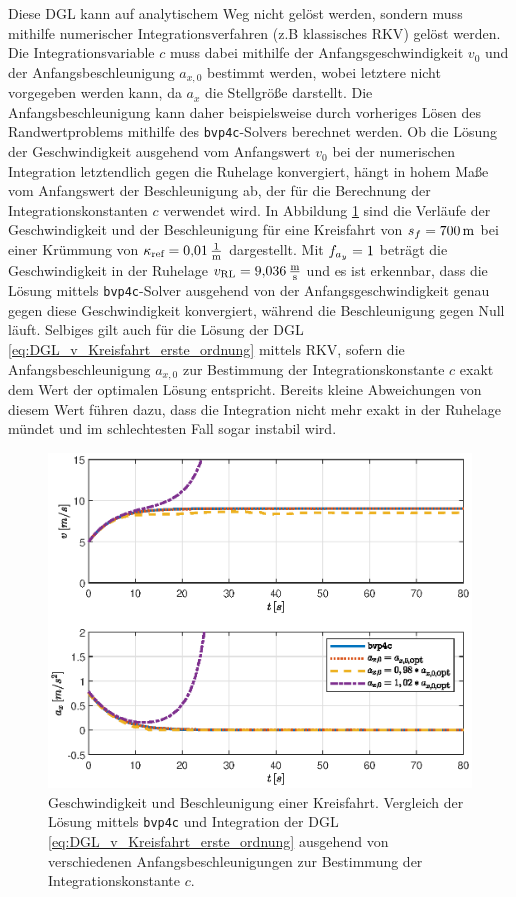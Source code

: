 Diese \gls{DGL} kann auf analytischem Weg nicht gelöst werden, sondern muss mithilfe numerischer Integrationsverfahren (z.B klassisches \gls{RKV}) gelöst werden. Die Integrationsvariable $c$ muss dabei mithilfe der Anfangsgeschwindigkeit $v_0$ und der  Anfangsbeschleunigung $a_{x,0}$ bestimmt werden, wobei letztere nicht vorgegeben werden kann, da $a_x$ die Stellgröße darstellt. Die Anfangsbeschleunigung kann daher beispielsweise durch vorheriges Lösen des Randwertproblems mithilfe des \texttt{bvp4c}-Solvers berechnet werden. Ob die Lösung der Geschwindigkeit ausgehend vom Anfangswert $v_0$ bei der numerischen Integration letztendlich gegen die Ruhelage konvergiert, hängt in hohem Maße vom Anfangswert der Beschleunigung ab, der für die Berechnung der Integrationskonstanten $c$ verwendet wird. In Abbildung \ref{fig:va_bvp4c_vs_odesol} sind die Verläufe der Geschwindigkeit und der Beschleunigung für eine Kreisfahrt von $s_f = 700\,\mathrm{m}$ bei einer Krümmung von $\kappa_{\textrm{ref}} = 0{,}01\,\mathrm{\frac{1}{\mathrm{m}}}$ dargestellt. Mit $f_{a_y} = 1$ beträgt die Geschwindigkeit in der Ruhelage $v_{\textrm{RL}} = 9{,}036\,\mathrm{\frac{\mathrm{m}}{\mathrm{s}}}$ und es ist erkennbar, dass die Lösung mittels \texttt{bvp4c}-Solver ausgehend von der Anfangsgeschwindigkeit genau gegen diese Geschwindigkeit konvergiert, während die Beschleunigung gegen Null läuft. Selbiges gilt auch für die Lösung der \gls{DGL} \eqref{eq:DGL_v_Kreisfahrt_erste_ordnung} mittels \gls{RKV}, sofern die Anfangsbeschleunigung $a_{x,0}$ zur Bestimmung der Integrationskonstante $c$ exakt dem Wert der optimalen Lösung entspricht. Bereits kleine Abweichungen von diesem Wert führen dazu, dass die Integration nicht mehr exakt in der Ruhelage mündet und im schlechtesten Fall sogar instabil wird. 
\begin{figure}[h] 
	\centering
	\includegraphics[width=0.8\linewidth]{./Bilder/Ergebnisse/Kreisfahrt/Ohne_Querdynamik/va_bvp4c_vs_odesol.eps}
	\caption{Geschwindigkeit und Beschleunigung einer Kreisfahrt. Vergleich der Lösung mittels \texttt{bvp4c} und Integration der \gls{DGL} \eqref{eq:DGL_v_Kreisfahrt_erste_ordnung} ausgehend von verschiedenen Anfangsbeschleunigungen zur Bestimmung der Integrationskonstante $c$.}
	\label{fig:va_bvp4c_vs_odesol}
\end{figure} 
